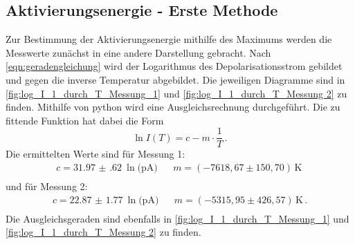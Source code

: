 \subsection{Aktivierungsenergie - Erste Methode}
  Zur Bestimmung der Aktivierungsenergie mithilfe des Maximums werden die Messwerte zunächst in eine andere Darstellung gebracht.
  Nach \eqref{eqn:geradengleichung} wird der Logarithmus des Depolarisationsstrom gebildet und gegen die inverse Temperatur abgebildet.
  Die jeweiligen Diagramme sind in \autoref{fig:log_I_1_durch_T_Messung_1} und \autoref{fig:log_I_1_durch_T_Messung 2} zu finden.
  Mithilfe von python wird eine Ausgleichsrechnung durchgeführt.
  Die zu fittende Funktion hat dabei die Form
  \begin{equation*}
    \ln{I(T)} = c - m \cdot \frac{1}{T} \, .
  \end{equation*}
  Die ermittelten Werte sind für Messung 1:
  \begin{align*}
    c =  \SI{31.97(62)}{\ln(\pico\ampere)} && m = (-7618,67\pm 150,70)\,\si{\kelvin} \,  \\
  \end{align*}
  und für Messung 2:
  \begin{align*}
    c = \SI{22.87(177)}{\ln(\pico\ampere)} && m = (-5315,95\pm 426,57)\,\si{\kelvin}  \, . \\ %
  \end{align*}
  Die Ausgleichsgeraden sind ebenfalls in \autoref{fig:log_I_1_durch_T_Messung_1} und \autoref{fig:log_I_1_durch_T_Messung 2} zu finden.

